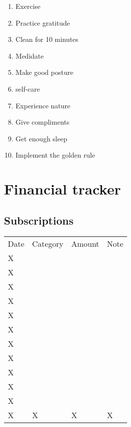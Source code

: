 \documentclass[a4paper]{article}
\begin{document}
\begin{enumerate}
	\item Exercise
  \item Practice gratitude
  \item Clean for 10 minutes
  \item Medidate
  \item Make good posture 
  \item self-care
  \item Experience nature 
  \item Give compliments
  \item Get enough sleep
  \item Implement the golden rule
\end{enumerate}
\newpage
\section{Financial tracker}
\subsection{Subscriptions}
\begin{table}[htp]
\begin{tabular}{llll}
Date & Category & Amount & Note \\
X    &          &        &      \\
X    &          &        &      \\
X    &          &        &      \\
X    &          &        &      \\
X    &          &        &      \\
X    &          &        &      \\
X    &          &        &      \\
X    &          &        &      \\
X    &          &        &      \\
X    &          &        &      \\
X    &          &        &      \\
X    &X         &X       &X    
\end{tabular}
\end{table}
\end{document}
